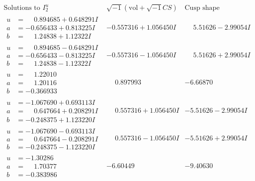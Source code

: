 \documentclass[1p]{elsarticle_modified}
\theoremstyle{definition}
\newcommand{\I}{\sqrt{-1}}
\begin{document}
$$\begin{array}{c|c|c}  
\text{Solutions to }I^u_{2}& \I (\text{vol} + \sqrt{-1}CS) & \text{Cusp shape}\\
 \hline 
\begin{aligned}
u &= \phantom{-}0.894685 + 0.648291 I \\
a &= -0.656433 + 0.813225 I \\
b &= \phantom{-}1.24838 + 1.12322 I\end{aligned}
 & -0.557316 + 1.056450 I & \phantom{-}5.51626 - 2.99054 I \\ \hline\begin{aligned}
u &= \phantom{-}0.894685 - 0.648291 I \\
a &= -0.656433 - 0.813225 I \\
b &= \phantom{-}1.24838 - 1.12322 I\end{aligned}
 & -0.557316 - 1.056450 I & \phantom{-}5.51626 + 2.99054 I \\ \hline\begin{aligned}
u &= \phantom{-}1.22010\phantom{ +0.000000I} \\
a &= \phantom{-}1.20116\phantom{ +0.000000I} \\
b &= -0.366933\phantom{ +0.000000I}\end{aligned}
 & \phantom{-}0.897993\phantom{ +0.000000I} & -6.66870\phantom{ +0.000000I} \\ \hline\begin{aligned}
u &= -1.067690 + 0.693113 I \\
a &= \phantom{-}0.647664 + 0.208291 I \\
b &= -0.248375 + 1.123220 I\end{aligned}
 & \phantom{-}0.557316 + 1.056450 I & -5.51626 - 2.99054 I \\ \hline\begin{aligned}
u &= -1.067690 - 0.693113 I \\
a &= \phantom{-}0.647664 - 0.208291 I \\
b &= -0.248375 - 1.123220 I\end{aligned}
 & \phantom{-}0.557316 - 1.056450 I & -5.51626 + 2.99054 I \\ \hline\begin{aligned}
u &= -1.30286\phantom{ +0.000000I} \\
a &= \phantom{-}1.70377\phantom{ +0.000000I} \\
b &= -0.383986\phantom{ +0.000000I}\end{aligned}
 & -6.60449\phantom{ +0.000000I} & -9.40630\phantom{ +0.000000I} \\ \hline\begin{aligned}

\end{aligned}
\end{array}$$
\end{document}
